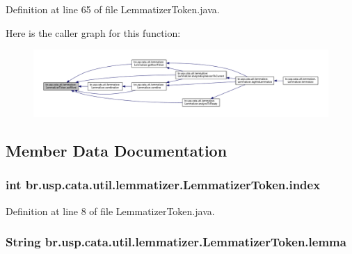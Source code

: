 Definition at line 65 of file Lemmatizer\+Token.\+java.



Here is the caller graph for this function\+:\nopagebreak
\begin{figure}[H]
\begin{center}
\leavevmode
\includegraphics[width=350pt]{classbr_1_1usp_1_1cata_1_1util_1_1lemmatizer_1_1_lemmatizer_token_a15d02c72374903304f157574391931ee_icgraph}
\end{center}
\end{figure}




\subsection{Member Data Documentation}
\hypertarget{classbr_1_1usp_1_1cata_1_1util_1_1lemmatizer_1_1_lemmatizer_token_a666f58e28bce2bbdb02cec7da5161ad9}{
\subsubsection[{index}]{\setlength{\rightskip}{0pt plus 5cm}int br.\+usp.\+cata.\+util.\+lemmatizer.\+Lemmatizer\+Token.\+index\hspace{0.3cm}{\ttfamily [private]}}}\label{classbr_1_1usp_1_1cata_1_1util_1_1lemmatizer_1_1_lemmatizer_token_a666f58e28bce2bbdb02cec7da5161ad9}


Definition at line 8 of file Lemmatizer\+Token.\+java.

\hypertarget{classbr_1_1usp_1_1cata_1_1util_1_1lemmatizer_1_1_lemmatizer_token_adf99abf5e53014d5c092791768a24733}{
\subsubsection[{lemma}]{\setlength{\rightskip}{0pt plus 5cm}String br.\+usp.\+cata.\+util.\+lemmatizer.\+Lemmatizer\+Token.\+lemma\hspace{0.3cm}{\ttfamily [private]}}}\label{classbr_1_1usp_1_1cata_1_1util_1_1lemmatizer_1_1_lemmatizer_token_adf99abf5e53014d5c092791768a24733}


